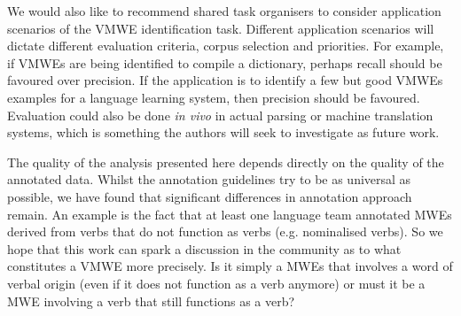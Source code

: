 \documentclass[output=paper
,modfonts
,nonflat,draftmode]{langsci/langscibook}
\begin{document}



We would also like to recommend shared task organisers to consider application scenarios of the VMWE identification task. Different application scenarios will dictate different evaluation criteria, corpus selection and priorities. For example, if VMWEs are being identified to compile a dictionary, perhaps recall should be favoured over precision. If the application is to identify a few but good VMWEs examples for a language learning system, then precision should be favoured. Evaluation could also be done \emph{in vivo} in actual parsing or machine translation systems, which is something the authors will seek to investigate as future work.

The quality of the analysis presented here depends directly on the quality of the annotated data. Whilst the annotation guidelines try to be as universal as possible, we have found that significant differences in annotation approach remain. An example is the fact that at least one language team annotated MWEs derived from verbs that do not function as verbs (e.g. nominalised verbs). So we hope that this work can spark a discussion in the community as to what constitutes a VMWE more precisely. Is it simply a MWEs that involves a word of verbal origin (even if it does not function as a verb anymore) or must it be a MWE involving a verb that still functions as a verb?
\end{document}
